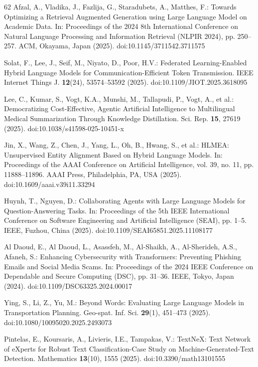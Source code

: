 \begin{thebibliography}{62}
Afzal, A., Vladika, J., Fazlija, G., Staradubets, A., Matthes, F.: Towards Optimizing a Retrieval Augmented Generation using Large Language Model on Academic Data. In: Proceedings of the 2024 8th International Conference on Natural Language Processing and Information Retrieval (NLPIR 2024), pp. 250--257. ACM, Okayama, Japan (2025). doi:10.1145/3711542.3711575

Solat, F., Lee, J., Seif, M., Niyato, D., Poor, H.V.: Federated Learning-Enabled Hybrid Language Models for Communication-Efficient Token Transmission. IEEE Internet Things J. \textbf{12}(24), 53574--53592 (2025). doi:10.1109/JIOT.2025.3618095

Lee, C., Kumar, S., Vogt, K.A., Munshi, M., Tallapudi, P., Vogt, A., et al.: Democratizing Cost-Effective, Agentic Artificial Intelligence to Multilingual Medical Summarization Through Knowledge Distillation. Sci. Rep. \textbf{15}, 27619 (2025). doi:10.1038/s41598-025-10451-x

Jin, X., Wang, Z., Chen, J., Yang, L., Oh, B., Hwang, S., et al.: HLMEA: Unsupervised Entity Alignment Based on Hybrid Language Models. In: Proceedings of the AAAI Conference on Artificial Intelligence, vol. 39, no. 11, pp. 11888--11896. AAAI Press, Philadelphia, PA, USA (2025). doi:10.1609/aaai.v39i11.33294

Huynh, T., Nguyen, D.: Collaborating Agents with Large Language Models for Question-Answering Tasks. In: Proceedings of the 5th IEEE International Conference on Software Engineering and Artificial Intelligence (SEAI), pp. 1--5. IEEE, Fuzhou, China (2025). doi:10.1109/SEAI65851.2025.11108177

Al Daoud, E., Al Daoud, L., Asassfeh, M., Al-Shaikh, A., Al-Sherideh, A.S., Afaneh, S.: Enhancing Cybersecurity with Transformers: Preventing Phishing Emails and Social Media Scams. In: Proceedings of the 2024 IEEE Conference on Dependable and Secure Computing (DSC), pp. 31--36. IEEE, Tokyo, Japan (2024). doi:10.1109/DSC63325.2024.00017

Ying, S., Li, Z., Yu, M.: Beyond Words: Evaluating Large Language Models in Transportation Planning. Geo-spat. Inf. Sci. \textbf{29}(1), 451--473 (2025). doi:10.1080/10095020.2025.2493073

Pintelas, E., Koursaris, A., Livieris, I.E., Tampakas, V.: TextNeX: Text Network of eXperts for Robust Text Classification-Case Study on Machine-Generated-Text Detection. Mathematics \textbf{13}(10), 1555 (2025). doi:10.3390/math13101555


\end{thebibliography}
